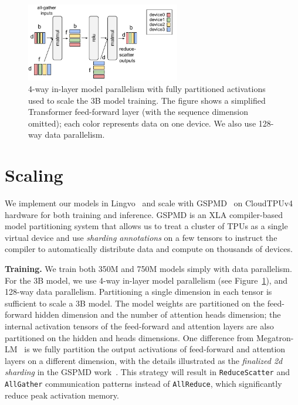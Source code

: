 \begin{figure}[t]
    \centering
    \includegraphics[width=0.6\textwidth]{figures/shard3b.pdf}
    \caption{4-way in-layer model parallelism with fully partitioned activations used to scale the 3B model training. The figure shows a simplified Transformer feed-forward layer (with the sequence dimension omitted); each color represents data on one device. We also use 128-way data parallelism.}
    \label{figs:shard3b}
\end{figure}

\section{Scaling}
We implement our models in Lingvo~\cite{shen2019lingvo} and scale with GSPMD~\cite{xu2021gspmd} on CloudTPUv4 hardware for both training and inference. GSPMD is an XLA compiler-based model partitioning system that allows us to treat a cluster of TPUs as a single virtual device and use \emph{sharding annotations} on a few tensors to instruct the compiler to automatically distribute data and compute on thousands of devices.

\textbf{Training.}
We train both 350M and 750M models simply with data parallelism. For the 3B model, we use 4-way in-layer model parallelism (see Figure~\ref{figs:shard3b}), and 128-way data parallelism. Partitioning a single dimension in each tensor is sufficient to scale a 3B model. The model weights are partitioned on the feed-forward hidden dimension and the number of attention heads dimension; the internal activation tensors of the feed-forward and attention layers are also partitioned on the hidden and heads dimensions. One difference from Megatron-LM~\cite{megatron} is we fully partition the output activations of feed-forward and attention layers on a different dimension, with the details illustrated as the \emph{finalized 2d sharding} in the GSPMD work~\cite{xu2021gspmd}. This strategy will result in \texttt{ReduceScatter} and \texttt{AllGather} communication patterns instead of \texttt{AllReduce}, which significantly reduce peak activation memory.

